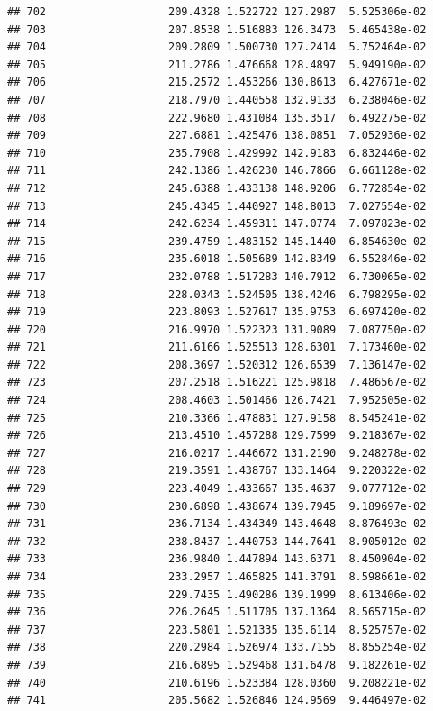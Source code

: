 \documentclass[
]{article}
\begin{document}
\begin{verbatim}
## 702                   209.4328 1.522722 127.2987  5.525306e-02
## 703                   207.8538 1.516883 126.3473  5.465438e-02
## 704                   209.2809 1.500730 127.2414  5.752464e-02
## 705                   211.2786 1.476668 128.4897  5.949190e-02
## 706                   215.2572 1.453266 130.8613  6.427671e-02
## 707                   218.7970 1.440558 132.9133  6.238046e-02
## 708                   222.9680 1.431084 135.3517  6.492275e-02
## 709                   227.6881 1.425476 138.0851  7.052936e-02
## 710                   235.7908 1.429992 142.9183  6.832446e-02
## 711                   242.1386 1.426230 146.7866  6.661128e-02
## 712                   245.6388 1.433138 148.9206  6.772854e-02
## 713                   245.4345 1.440927 148.8013  7.027554e-02
## 714                   242.6234 1.459311 147.0774  7.097823e-02
## 715                   239.4759 1.483152 145.1440  6.854630e-02
## 716                   235.6018 1.505689 142.8349  6.552846e-02
## 717                   232.0788 1.517283 140.7912  6.730065e-02
## 718                   228.0343 1.524505 138.4246  6.798295e-02
## 719                   223.8093 1.527617 135.9753  6.697420e-02
## 720                   216.9970 1.522323 131.9089  7.087750e-02
## 721                   211.6166 1.525513 128.6301  7.173460e-02
## 722                   208.3697 1.520312 126.6539  7.136147e-02
## 723                   207.2518 1.516221 125.9818  7.486567e-02
## 724                   208.4603 1.501466 126.7421  7.952505e-02
## 725                   210.3366 1.478831 127.9158  8.545241e-02
## 726                   213.4510 1.457288 129.7599  9.218367e-02
## 727                   216.0217 1.446672 131.2190  9.248278e-02
## 728                   219.3591 1.438767 133.1464  9.220322e-02
## 729                   223.4049 1.433667 135.4637  9.077712e-02
## 730                   230.6898 1.438674 139.7945  9.189697e-02
## 731                   236.7134 1.434349 143.4648  8.876493e-02
## 732                   238.8437 1.440753 144.7641  8.905012e-02
## 733                   236.9840 1.447894 143.6371  8.450904e-02
## 734                   233.2957 1.465825 141.3791  8.598661e-02
## 735                   229.7435 1.490286 139.1999  8.613406e-02
## 736                   226.2645 1.511705 137.1364  8.565715e-02
## 737                   223.5801 1.521335 135.6114  8.525757e-02
## 738                   220.2984 1.526974 133.7155  8.855254e-02
## 739                   216.6895 1.529468 131.6478  9.182261e-02
## 740                   210.6196 1.523384 128.0360  9.208221e-02
## 741                   205.5682 1.526846 124.9569  9.446497e-02

\end{verbatim}
\end{document}

